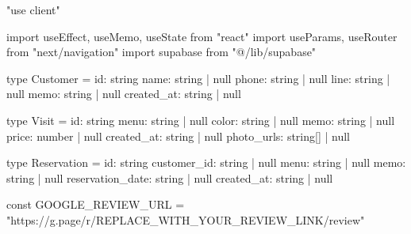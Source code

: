 "use client"

import { useEffect, useMemo, useState } from "react"
import { useParams, useRouter } from "next/navigation"
import { supabase } from "@/lib/supabase"

type Customer = {
  id: string
  name: string | null
  phone: string | null
  line: string | null
  memo: string | null
  created_at: string | null
}

type Visit = {
  id: string
  menu: string | null
  color: string | null
  memo: string | null
  price: number | null
  created_at: string | null
  photo_urls: string[] | null
}

type Reservation = {
  id: string
  customer_id: string | null
  menu: string | null
  memo: string | null
  reservation_date: string | null
  created_at: string | null
}

const GOOGLE_REVIEW_URL = "https://g.page/r/REPLACE_WITH_YOUR_REVIEW_LINK/review"

